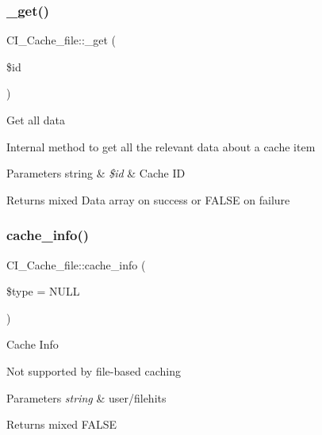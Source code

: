 \subsubsection{\texorpdfstring{\+\_\+get()}{\_get()}}
{\footnotesize\ttfamily C\+I\+\_\+\+Cache\+\_\+file\+::\+\_\+get (\begin{DoxyParamCaption}\item[{}]{\$id }\end{DoxyParamCaption})\hspace{0.3cm}{\ttfamily [protected]}}

Get all data

Internal method to get all the relevant data about a cache item


\begin{DoxyParams}[1]{Parameters}
string & {\em \$id} & Cache ID \\
\hline
\end{DoxyParams}
\begin{DoxyReturn}{Returns}
mixed Data array on success or F\+A\+L\+SE on failure 
\end{DoxyReturn}
\mbox{\label{class_c_i___cache__file_a8ef586f2e10ac9bbdd0eaf09796592d3}} 
\subsubsection{\texorpdfstring{cache\+\_\+info()}{cache\_info()}}
{\footnotesize\ttfamily C\+I\+\_\+\+Cache\+\_\+file\+::cache\+\_\+info (\begin{DoxyParamCaption}\item[{}]{\$type = {\ttfamily NULL} }\end{DoxyParamCaption})}

Cache Info

Not supported by file-\/based caching


\begin{DoxyParams}{Parameters}
{\em string} & user/filehits \\
\hline
\end{DoxyParams}
\begin{DoxyReturn}{Returns}
mixed F\+A\+L\+SE 
\end{DoxyReturn}
\mbox{\label{class_c_i___cache__file_a7af3371589ac5bdb2aed9e474257e439}} 
